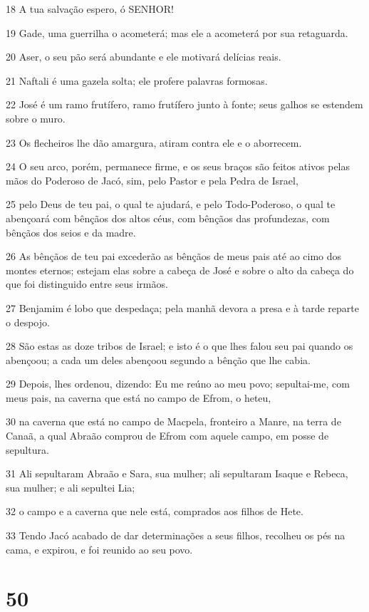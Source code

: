 \par 18 A tua salvação espero, ó SENHOR!
\par 19 Gade, uma guerrilha o acometerá; mas ele a acometerá por sua retaguarda.
\par 20 Aser, o seu pão será abundante e ele motivará delícias reais.
\par 21 Naftali é uma gazela solta; ele profere palavras formosas.
\par 22 José é um ramo frutífero, ramo frutífero junto à fonte; seus galhos se estendem sobre o muro.
\par 23 Os flecheiros lhe dão amargura, atiram contra ele e o aborrecem.
\par 24 O seu arco, porém, permanece firme, e os seus braços são feitos ativos pelas mãos do Poderoso de Jacó, sim, pelo Pastor e pela Pedra de Israel,
\par 25 pelo Deus de teu pai, o qual te ajudará, e pelo Todo-Poderoso, o qual te abençoará com bênçãos dos altos céus, com bênçãos das profundezas, com bênçãos dos seios e da madre.
\par 26 As bênçãos de teu pai excederão as bênçãos de meus pais até ao cimo dos montes eternos; estejam elas sobre a cabeça de José e sobre o alto da cabeça do que foi distinguido entre seus irmãos.
\par 27 Benjamim é lobo que despedaça; pela manhã devora a presa e à tarde reparte o despojo.
\par 28 São estas as doze tribos de Israel; e isto é o que lhes falou seu pai quando os abençoou; a cada um deles abençoou segundo a bênção que lhe cabia.
\par 29 Depois, lhes ordenou, dizendo: Eu me reúno ao meu povo; sepultai-me, com meus pais, na caverna que está no campo de Efrom, o heteu,
\par 30 na caverna que está no campo de Macpela, fronteiro a Manre, na terra de Canaã, a qual Abraão comprou de Efrom com aquele campo, em posse de sepultura.
\par 31 Ali sepultaram Abraão e Sara, sua mulher; ali sepultaram Isaque e Rebeca, sua mulher; e ali sepultei Lia;
\par 32 o campo e a caverna que nele está, comprados aos filhos de Hete.
\par 33 Tendo Jacó acabado de dar determinações a seus filhos, recolheu os pés na cama, e expirou, e foi reunido ao seu povo.

\chapter{50}

